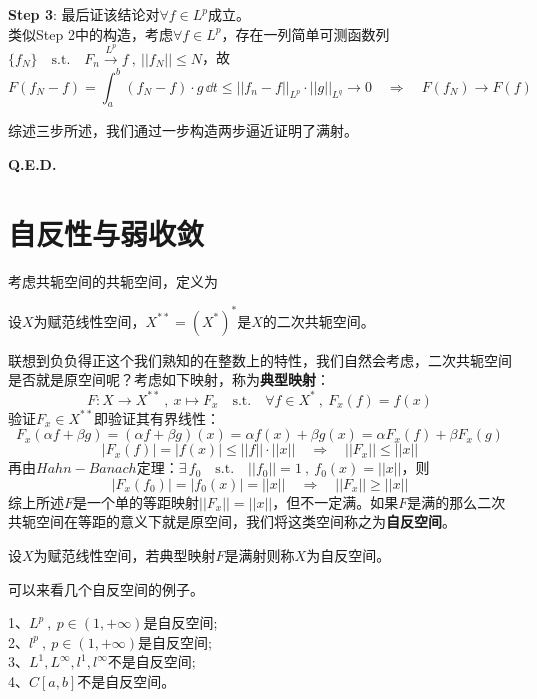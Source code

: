 \textbf{Step 3}: 最后证该结论对$\forall f \in L^p$成立。\\
类似Step 2中的构造，考虑$\forall f \in L^p$，存在一列简单可测函数列$\{f_N\} \quad \text{s.t.} \quad F_n \xrightarrow{L^p} f \ , \ ||f_N|| \leq N$，故
\[F(f_N-f)=\int_a^b(f_N-f) \cdot g \, \dd t \leq ||f_n-f||_{L^p} \cdot ||g||_{L^q} \to 0 \quad \Rightarrow \quad F(f_N) \to F(f)\]

综述三步所述，我们通过一步构造两步逼近证明了满射。

\textbf{Q.E.D.}
\section{自反性与弱收敛}
考虑共轭空间的共轭空间，定义为
\begin{definition}[二次共轭空间]
    设$X$为赋范线性空间，$X^{**}=(X^*)^*$是$X$的二次共轭空间。
\end{definition}
联想到负负得正这个我们熟知的在整数上的特性，我们自然会考虑，二次共轭空间是否就是原空间呢？考虑如下映射，称为\textbf{典型映射}：
\[F:X \to X^{**} \ , \ x \mapsto F_x \quad \text{s.t.} \quad \forall f \in X^* \ , \ F_x(f)=f(x)\]
验证$F_x \in X^{**}$即验证其有界线性：
\[F_x(\alpha f+\beta g)=(\alpha f+\beta g)(x)=\alpha f(x)+\beta g(x)=\alpha F_x(f)+\beta F_x(g)\]
\[|F_x(f)|=|f(x)| \leq ||f|| \cdot ||x|| \quad \Rightarrow \quad ||F_x|| \leq ||x||\]
再由$Hahn-Banach$定理：$\exists \, f_0 \quad \text{s.t.} \quad ||f_0||=1 \ , \ f_0(x)=||x||$，则
\[|F_x(f_0)|=|f_0(x)|=||x|| \quad \Rightarrow \quad ||F_x|| \geq ||x||\]
综上所述$F$是一个单的等距映射$||F_x||=||x||$，但不一定满。如果$F$是满的那么二次共轭空间在等距的意义下就是原空间，我们将这类空间称之为\textbf{自反空间}。
\begin{definition}[二次共轭空间]
    设$X$为赋范线性空间，若典型映射$F$是满射则称$X$为自反空间。
\end{definition}
可以来看几个自反空间的例子。
\begin{proposition}
    1、$L^p \ , \ p \in (1,+\infty)$是自反空间;\\
    2、$l^p \ , \ p \in (1,+\infty)$是自反空间;\\
    3、$L^1,L^{\infty},l^1,l^{\infty}$不是自反空间;\\
    4、$C[a,b]$不是自反空间。
\end{proposition}